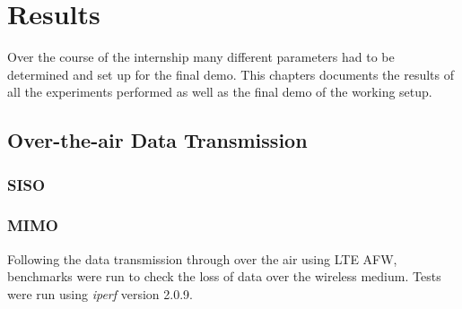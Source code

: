 \chapter{Results}
\label{ch:results}

Over the course of the internship many different parameters had to be determined and set up for the final demo. This chapters documents the results of all the experiments performed as well as the final demo of the working setup.

\section{Over-the-air Data Transmission}\label{ssec:OTADataTrans}

\subsection{SISO}\label{ssec:SISOOTA}

\subsection{MIMO}\label{ssec:MIMOOTA}

Following the data transmission through over the air using LTE AFW, benchmarks were run to check the loss of data over the wireless medium. Tests were run using \textit{iperf} version 2.0.9.

